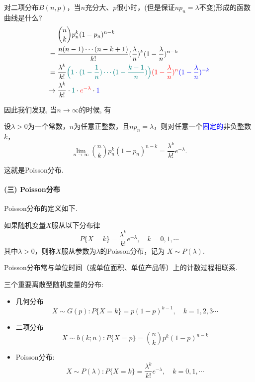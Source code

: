 对二项分布$B(n,p)$，当$n$充分大、$p$很小时，(但是保证$np_n=\lambda$不变)形成的函数曲线是什么?
\begin{align*}
                   & {n \choose k}p_n^k(1-p_n)^{n-k}                                                                                                                                                    \\
    ={}            & \frac{n(n-1)\cdots (n-k+1)}{k!}(\frac{\lambda}{n})^k(1-\frac{\lambda}{n})^{n-k}                                                                                                    \\
    ={}            & \frac{\lambda^k}{k!}\textcolor{teal}{\Big(1\cdot (1-\frac{1}{n})\cdots (1-\frac{k-1}{n})\Big)}\textcolor{red}{(1-\frac{\lambda}{n})^n}\textcolor{blue}{(1-\frac{\lambda}{n})^{-k}} \\
    \rightarrow {} & \frac{\lambda^k}{k!}\cdot \textcolor{teal}{1}\cdot \textcolor{red}{e^{-\lambda}}\cdot \textcolor{blue}{1}
\end{align*}

因此我们发现, 当$n\to\infty$的时候, 有
\begin{theorem}
    设$\lambda>0$为一个常数，$n$为任意正整数，且$np_n=\lambda$，则对任意一个\textcolor{blue}{固定的}非负整数$k$，
    $$
        \lim_{n\rightarrow \infty}{n\choose k}p_n^k(1-p_n)^{n-k}=\frac{\lambda^k}{k!}e^{-\lambda}.
    $$
\end{theorem}
这就是Poisson分布.

\paragraph{(三) Poisson分布}

Poisson分布的定义如下.
\begin{definition}[Poisson分布]
    如果随机变量$X$服从以下分布律
    \[ P\{X=k\}=\frac{\lambda^k}{k!}e^{-\lambda},\quad k=0,1,\cdots \]
    其中$\lambda>0$，则称$X$服从参数为$\lambda$的Poisson分布，记为
    $X\sim P(\lambda).$
\end{definition}%
Poisson分布常与单位时间（或单位面积、单位产品等）上的计数过程相联系.

\begin{takeaway}
    三个重要离散型随机变量的分布:
    \begin{itemize}
        \item 几何分布$$X\sim G(p): P\{X=k\}=p(1-p)^{k-1}, \quad k=1,2,3 \cdots$$
        \item 二项分布$$X\sim b(k ; n): P\{X=p\}=\binom nk p^k(1-p)^{n-k}$$
        \item Poisson分布: $$X\sim P(\lambda): P\{X=k\}=\frac{\lambda^k}{k !} e^{-\lambda}, \quad k=0,1, \cdots$$
    \end{itemize}
\end{takeaway}